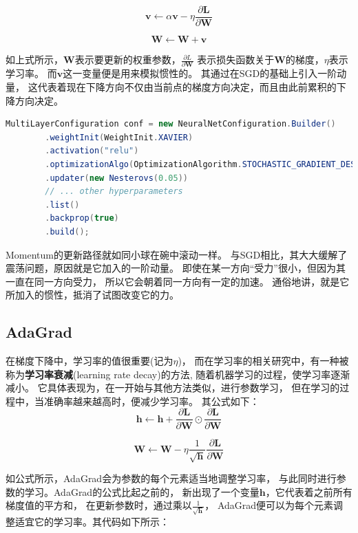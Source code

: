 $$\boldsymbol{v} \leftarrow \alpha \boldsymbol{v}-\eta \frac{\partial \boldsymbol{L}}{\partial \boldsymbol{W}}$$

$$\boldsymbol{W} \leftarrow \boldsymbol{W}+\boldsymbol{v}$$

\noindent
如上式所示，$\boldsymbol{W}$表示要更新的权重参数，$\frac{\partial L}{\partial \boldsymbol{W}}$
表示损失函数关于$\boldsymbol{W}$的梯度，$\eta$表示学习率。
而$\boldsymbol{v}$这一变量便是用来模拟惯性的。
其通过在SGD的基础上引入一阶动量，
这代表着现在下降方向不仅由当前点的梯度方向决定，而且由此前累积的下降方向决定。 


\begin{lstlisting}[language=java]
	MultiLayerConfiguration conf = new NeuralNetConfiguration.Builder()
        .weightInit(WeightInit.XAVIER)
        .activation("relu")
        .optimizationAlgo(OptimizationAlgorithm.STOCHASTIC_GRADIENT_DESCENT)
        .updater(new Nesterovs(0.05))
        // ... other hyperparameters
        .list()
        .backprop(true)
        .build();
\end{lstlisting}

\noindent
Momentum的更新路径就如同小球在碗中滚动一样。
与SGD相比，其大大缓解了震荡问题，原因就是它加入的一阶动量。
即使在某一方向“受力”很小，但因为其一直在同一方向受力，
所以它会朝着同一方向有一定的加速。
通俗地讲，就是它所加入的惯性，抵消了试图改变它的力。

\subsection{AdaGrad}
在梯度下降中，学习率的值很重要(记为$\eta$)，
而在学习率的相关研究中，有一种被称为\textbf{学习率衰减}(learning rate decay)的方法,
随着机器学习的过程，使学习率逐渐减小。
它具体表现为，在一开始与其他方法类似，进行参数学习，
但在学习的过程中，当准确率越来越高时，便减少学习率。
其公式如下：
$$\boldsymbol{h} \leftarrow \boldsymbol{h}+\frac{\partial \boldsymbol{L}}{\partial \boldsymbol{W}} \odot \frac{\partial \boldsymbol{L}}{\partial \boldsymbol{W}}$$

$$\boldsymbol{W} \leftarrow \boldsymbol{W}-\eta \frac{1}{\sqrt{\boldsymbol{h}}} \frac{\partial \boldsymbol{L}}{\partial \boldsymbol{W}}$$

如公式所示，AdaGrad会为参数的每个元素适当地调整学习率，
与此同时进行参数的学习。AdaGrad的公式比起之前的，
新出现了一个变量$\boldsymbol{h}$，它代表着之前所有梯度值的平方和，
在更新参数时，通过乘以$\frac{1}{\sqrt{\boldsymbol{h}}}$，
AdaGrad便可以为每个元素调整适宜它的学习率。其代码如下所示：

